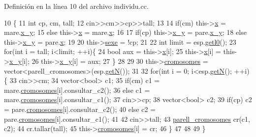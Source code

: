 Definición en la línea 10 del archivo individu.\+cc.


\begin{DoxyCode}
10                                                                        \{
11       \textcolor{keywordtype}{int} cp, cm, tall;
12       cin>>cm>>cp>>tall;
13 
14       \textcolor{keywordflow}{if}(cm) this->\hyperlink{classindividu_a3c4abda8daead156b5519f69bd224fa9}{x} = mare.\hyperlink{classindividu_a51eb7827fdd5bd5302e3c962fd719fc0}{x\_y};
15       \textcolor{keywordflow}{else} this->\hyperlink{classindividu_a3c4abda8daead156b5519f69bd224fa9}{x} = mare.\hyperlink{classindividu_a3c4abda8daead156b5519f69bd224fa9}{x};
16 
17       \textcolor{keywordflow}{if}(cp) this->\hyperlink{classindividu_a51eb7827fdd5bd5302e3c962fd719fc0}{x\_y} = pare.\hyperlink{classindividu_a51eb7827fdd5bd5302e3c962fd719fc0}{x\_y};
18       \textcolor{keywordflow}{else} this->\hyperlink{classindividu_a51eb7827fdd5bd5302e3c962fd719fc0}{x\_y} = pare.\hyperlink{classindividu_a3c4abda8daead156b5519f69bd224fa9}{x};
19 
20       this->\hyperlink{classindividu_ab62faa6985cc0520c33a206fc5a89e37}{sexe} = !cp;
21 
22       \textcolor{keywordtype}{int} limit = esp.\hyperlink{classespecie_a5ea723fe64398cd46cbc6e044b114fff}{getl0}();
23       \textcolor{keywordflow}{for}(\textcolor{keywordtype}{int} i = tall; i<limit; ++i)\{
24         \textcolor{keywordtype}{bool} aux = this->\hyperlink{classindividu_a3c4abda8daead156b5519f69bd224fa9}{x}[i];
25         this->\hyperlink{classindividu_a3c4abda8daead156b5519f69bd224fa9}{x}[i] = this->\hyperlink{classindividu_a51eb7827fdd5bd5302e3c962fd719fc0}{x\_y}[i];
26         this->\hyperlink{classindividu_a51eb7827fdd5bd5302e3c962fd719fc0}{x\_y}[i] = aux;
27       \}
28 
29 
30       this->\hyperlink{classindividu_ae5e0a83ff9e943cbcdf95b74069ad3a7}{cromosomes} = vector<parell\_cromosomes>(esp.\hyperlink{classespecie_a16cbac301660254cf39ef7f51690e507}{getN}());
31 
32       \textcolor{keywordflow}{for}(\textcolor{keywordtype}{int} i = 0; i<esp.\hyperlink{classespecie_a16cbac301660254cf39ef7f51690e507}{getN}(); ++i)\{
33         cin>>cm;
34         vector<bool> c1;
35         \textcolor{keywordflow}{if}(cm) c1 = mare.\hyperlink{classindividu_ae5e0a83ff9e943cbcdf95b74069ad3a7}{cromosomes}[i].consultar\_c2();
36         \textcolor{keywordflow}{else} c1 = mare.\hyperlink{classindividu_ae5e0a83ff9e943cbcdf95b74069ad3a7}{cromosomes}[i].consultar\_c1();
37         cin>>cp;
38         vector<bool> c2;
39         \textcolor{keywordflow}{if}(cp) c2 = pare.\hyperlink{classindividu_ae5e0a83ff9e943cbcdf95b74069ad3a7}{cromosomes}[i].consultar\_c2();
40         \textcolor{keywordflow}{else} c2 = pare.\hyperlink{classindividu_ae5e0a83ff9e943cbcdf95b74069ad3a7}{cromosomes}[i].consultar\_c1();
41 
42         cin>>tall;
43         \hyperlink{classparell__cromosomes}{parell\_cromosomes} cr(c1, c2);
44         cr.tallar(tall);
45         this->\hyperlink{classindividu_ae5e0a83ff9e943cbcdf95b74069ad3a7}{cromosomes}[i] = cr;
46       \}
47 
48 
49 \}
\end{DoxyCode}


